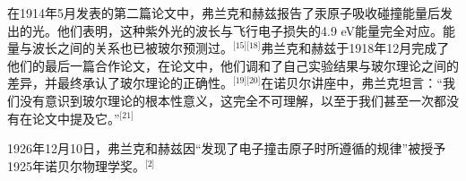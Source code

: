 在1914年5月发表的第二篇论文中，弗兰克和赫兹报告了汞原子吸收碰撞能量后发出的光。他们表明，这种紫外光的波长与飞行电子损失的4.9 eV能量完全对应。能量与波长之间的关系也已被玻尔预测过。\(^\text{[15][18]}\)弗兰克和赫兹于1918年12月完成了他们的最后一篇合作论文，在论文中，他们调和了自己实验结果与玻尔理论之间的差异，并最终承认了玻尔理论的正确性。\(^\text{[19][20]}\)在诺贝尔讲座中，弗兰克坦言：“我们没有意识到玻尔理论的根本性意义，这完全不可理解，以至于我们甚至一次都没有在论文中提及它。”\(^\text{[21]}\)

1926年12月10日，弗兰克和赫兹因“发现了电子撞击原子时所遵循的规律”被授予1925年诺贝尔物理学奖。\(^\text{[2]}\)

